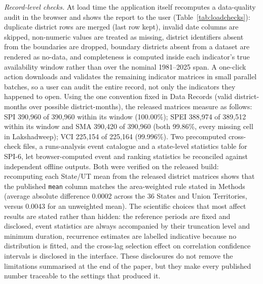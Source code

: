 \documentclass[10pt,a4paper]{article}
\begin{document}
\emph{Record-level checks.} At load time the application itself recomputes a data-quality audit in the browser and shows the report to the user (Table~\ref{tab:loadchecks}): duplicate district rows are merged (last row kept), invalid date columns are skipped, non-numeric values are treated as missing, district identifiers absent from the boundaries are dropped, boundary districts absent from a dataset are rendered as no-data, and completeness is computed inside each indicator's true availability window rather than over the nominal 1981--2025 span. A one-click action downloads and validates the remaining indicator matrices in small parallel batches, so a user can audit the entire record, not only the indicators they happened to open. Using the one convention fixed in Data Records (valid district-months over possible district-months), the released matrices measure as follows: SPI 390{,}960 of 390{,}960 within its window (100.00\%); SPEI 388{,}974 of 389{,}512 within its window and SMA 390{,}420 of 390{,}960 (both 99.86\%, every missing cell in Lakshadweep); VCI 225{,}154 of 225{,}164 (99.996\%). Two precomputed cross-check files, a runs-analysis event catalogue and a state-level statistics table for SPI-6, let browser-computed event and ranking statistics be reconciled against independent offline outputs. Both were verified on the released build: recomputing each State/UT mean from the released district matrices shows that the published \texttt{mean} column matches the area-weighted rule stated in Methods (average absolute difference 0.0002 across the 36 States and Union Territories, versus 0.0043 for an unweighted mean). The scientific choices that most affect results are stated rather than hidden: the reference periods are fixed and disclosed, event statistics are always accompanied by their truncation level and minimum duration, recurrence estimates are labelled indicative because no distribution is fitted, and the cross-lag selection effect on correlation confidence intervals is disclosed in the interface. These disclosures do not remove the limitations summarised at the end of the paper, but they make every published number traceable to the settings that produced it.
\end{document}
